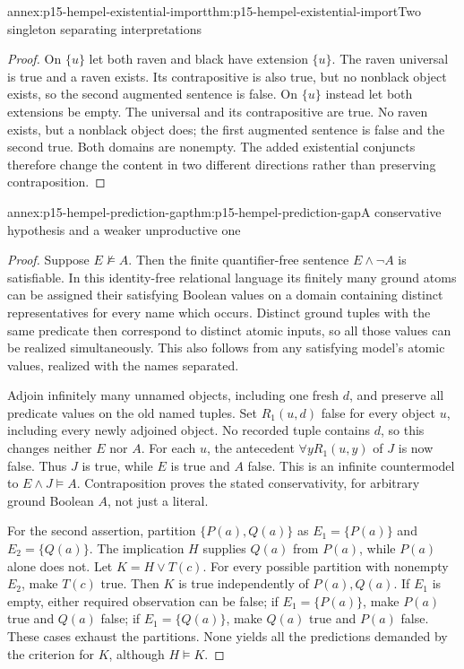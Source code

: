 \begin{annexitem}{annex:p15-hempel-existential-import}{thm:p15-hempel-existential-import}{Two singleton separating interpretations}
\begin{proof}
On $\{u\}$ let both raven and black have extension $\{u\}$. The raven
universal is true and a raven exists. Its contrapositive is also true,
but no nonblack object exists, so the second augmented sentence is false.
On $\{u\}$ instead let both extensions be empty. The universal and its
contrapositive are true. No raven exists, but a nonblack object does;
the first augmented sentence is false and the second true. Both domains
are nonempty. The added existential conjuncts therefore change the
content in two different directions rather than preserving contraposition.
\end{proof}
\end{annexitem}

\begin{annexitem}{annex:p15-hempel-prediction-gap}{thm:p15-hempel-prediction-gap}{A conservative hypothesis and a weaker unproductive one}
\begin{proof}
Suppose $E\not\models A$. Then the finite quantifier-free sentence
$E\land\neg A$ is satisfiable. In this identity-free relational language
its finitely many ground atoms can be assigned their satisfying Boolean
values on a domain containing distinct representatives for every name
which occurs. Distinct ground tuples with the same predicate then
correspond to distinct atomic inputs, so all those values can be realized
simultaneously. This also follows from any satisfying model's atomic
values, realized with the names separated.

Adjoin infinitely many unnamed objects, including one fresh $d$, and
preserve all predicate values on the old named tuples. Set $R_1(u,d)$
false for every object $u$, including every newly adjoined object. No
recorded tuple contains $d$, so this changes neither $E$ nor $A$.
For each $u$, the antecedent $\forall yR_1(u,y)$ of $J$ is now false.
Thus $J$ is true, while $E$ is true and $A$ false. This is an infinite
countermodel to $E\land J\models A$. Contraposition proves the stated
conservativity, for arbitrary ground Boolean $A$, not just a literal.

For the second assertion, partition $\{P(a),Q(a)\}$ as
$E_1=\{P(a)\}$ and $E_2=\{Q(a)\}$. The implication $H$ supplies $Q(a)$
from $P(a)$, while $P(a)$ alone does not. Let $K=H\lor T(c)$.
For every possible partition with nonempty $E_2$, make $T(c)$ true.
Then $K$ is true independently of $P(a),Q(a)$. If $E_1$ is empty,
either required observation can be false; if $E_1=\{P(a)\}$, make
$P(a)$ true and $Q(a)$ false; if $E_1=\{Q(a)\}$, make $Q(a)$ true
and $P(a)$ false. These cases exhaust the partitions. None yields all
the predictions demanded by the criterion for $K$, although $H\models K$.
\end{proof}
\end{annexitem}

